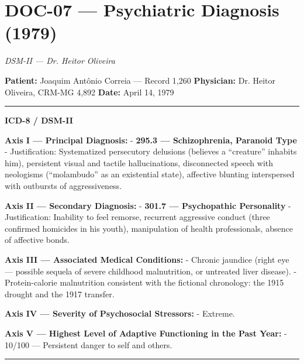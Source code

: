 \section*{\textbf{DOC-07} --- Psychiatric Diagnosis (1979)}

\noindent \textit{DSM-II --- Dr. Heitor Oliveira}

\noindent \textbf{Patient:} Joaquim Antônio Correia --- Record 1,260
\textbf{Physician:} Dr. Heitor Oliveira, CRM-MG 4,892
\textbf{Date:} April 14, 1979

\vspace{0.5em}\noindent\rule{\textwidth}{0.5pt}\vspace{0.5em}

\noindent \textbf{ICD-8 / DSM-II}

\noindent \textbf{Axis I --- Principal Diagnosis:}
- \textbf{295.3 --- Schizophrenia, Paranoid Type}
  - Justification: Systematized persecutory delusions (believes a \textquotedblleft{}creature\textquotedblright{} inhabits him), persistent visual and tactile hallucinations, disconnected speech with neologisms (\textquotedblleft{}molambudo\textquotedblright{} as an existential state), affective blunting interspersed with outbursts of aggressiveness.

\noindent \textbf{Axis II --- Secondary Diagnosis:}
- \textbf{301.7 --- Psychopathic Personality}
  - Justification: Inability to feel remorse, recurrent aggressive conduct (three confirmed homicides in his youth), manipulation of health professionals, absence of affective bonds.

\noindent \textbf{Axis III --- Associated Medical Conditions:}
- Chronic jaundice (right eye --- possible sequela of severe childhood malnutrition, or untreated liver disease).
- Protein-calorie malnutrition consistent with the fictional chronology: the 1915 drought and the 1917 transfer.

\noindent \textbf{Axis IV --- Severity of Psychosocial Stressors:}
- Extreme.

\noindent \textbf{Axis V --- Highest Level of Adaptive Functioning in the Past Year:}
- 10/100 --- Persistent danger to self and others.

\vspace{0.5em}\noindent\rule{\textwidth}{0.5pt}\vspace{0.5em}

